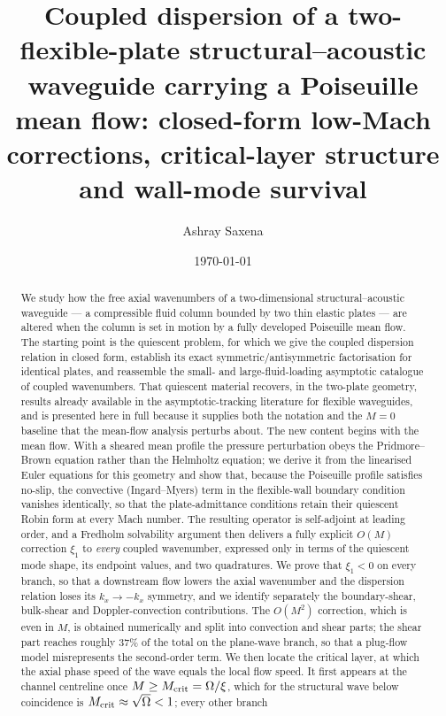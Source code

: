 \documentclass[11pt,a4paper]{article}
\title{\textbf{Coupled dispersion of a two-flexible-plate structural--acoustic
waveguide carrying a Poiseuille mean flow: closed-form low-Mach corrections,
critical-layer structure and wall-mode survival}}
\author[1]{Ashray Saxena}
\affil[1]{\small Department of Mechanical Engineering, Birla Institute of Technology \& Science Pilani,
Pilani Campus, Rajasthan 333031, India}
\date{\today}
\newcommand{\Om}{\Omega}
\theoremstyle{plain}
\theoremstyle{remark}
\begin{document}
\maketitle
\linenumbers

\begin{abstract}
\noindent
We study how the free axial wavenumbers of a two-dimensional structural--acoustic waveguide --- a
compressible fluid column bounded by two thin elastic plates --- are altered when the column is set in
motion by a fully developed Poiseuille mean flow. The starting point is the quiescent problem, for
which we give the coupled dispersion relation in closed form, establish its exact
symmetric/antisymmetric factorisation for identical plates, and reassemble the small- and
large-fluid-loading asymptotic catalogue of coupled wavenumbers. That quiescent material recovers, in
the two-plate geometry, results already available in the asymptotic-tracking literature for flexible
waveguides, and is presented here in full because it supplies both the notation and the $M=0$ baseline
that the mean-flow analysis perturbs about. The new content begins with the mean flow. With a sheared
mean profile the pressure perturbation obeys the Pridmore--Brown equation rather than the Helmholtz
equation; we derive it from the linearised Euler equations for this geometry and show that, because the
Poiseuille profile satisfies no-slip, the convective (Ingard--Myers) term in the flexible-wall boundary
condition vanishes identically, so that the plate-admittance conditions retain their quiescent Robin
form at every Mach number. The resulting operator is self-adjoint at leading order, and a Fredholm
solvability argument then delivers a fully explicit $O(M)$ correction $\xi_1$ to \emph{every} coupled
wavenumber, expressed only in terms of the quiescent mode shape, its endpoint values, and two
quadratures. We prove that $\xi_1<0$ on every branch, so that a downstream flow lowers the axial
wavenumber and the dispersion relation loses its $k_x\to-k_x$ symmetry, and we identify separately the
boundary-shear, bulk-shear and Doppler-convection contributions. The $O(M^2)$ correction, which is even
in $M$, is obtained numerically and split into convection and shear parts; the shear part reaches
roughly $37\%$ of the total on the plane-wave branch, so that a plug-flow model misrepresents the
second-order term. We then locate the critical layer, at which the axial phase speed of the wave equals
the local flow speed. It first appears at the channel centreline once $M\ge M_{\rm crit}=\Om/\xi$, which
for the structural wave below coincidence is $M_{\rm crit}\approx\sqrt{\Om}<1$; every other branch

\end{abstract}
\end{document}
